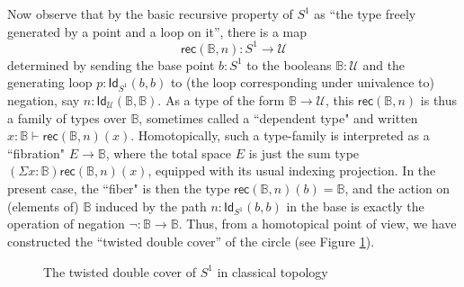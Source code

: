 \documentclass[11pt]{article}
\newcommand{\B}{\ensuremath{\mathbb{B}}}
\newcommand{\Id}{\mathsf{Id}}
\newcommand{\id}[1]{\Id_{#1}}
\newcommand{\rec}{\mathsf{rec}}
\newcommand{\U}{\ensuremath{\mathcal{U}}}
\theoremstyle{remark}
\theoremstyle{definition}
\begin{document}
Now observe that by the basic recursive property of $S^1$ as ``the type freely generated by a point and a loop on it'', there is a map $$\rec(\B,n): S^1 \to \U$$ determined by sending the base point $b:S^1$ to the booleans $\B:\U$ and the generating loop $p : \id{S^1}(b,b)$ to (the loop corresponding under univalence to) negation, say $n : \id{\U}(\B,\B)$.  As a type of the form $\B\to\U$, this $\rec(\B,n)$ is thus a family of types over $\B$, sometimes called a ``dependent type" and written $x:\B \vdash \rec(\B,n)(x)$.  Homotopically, such a type-family is interpreted as a ``fibration" $E\to\B$, where the total space $E$ is just the sum type $(\Sigma{x:\B})\rec(\B,n)(x)$, equipped with its usual indexing projection.  In the present case, the ``fiber" is then the type $\rec(\B,n)(b) = \B$, and the action on (elements of) $\B$ induced by the path $n: \id{S^1}(b,b)$ in the base is exactly the operation of negation $\neg : \B\to \B$.  Thus, from a homotopical point of view, we have constructed the ``twisted double cover'' of the circle (see Figure \ref{fig:winding}).
%
%
\begin{figure}\centering
  \caption{The twisted double cover of $S^1$ in classical topology}\label{fig:winding}
\end{figure}
%
\end{document}
